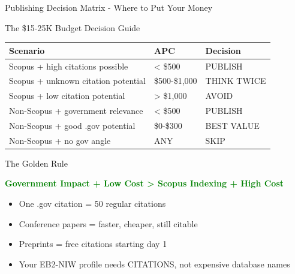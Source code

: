 \documentclass[11pt]{beamer}
\begin{document}
	
	\begin{frame}{Publishing Decision Matrix - Where to Put Your Money}
		\scriptsize
		\begin{block}{The \$15-25K Budget Decision Guide}
			\centering
			\begin{tabular}{|p{3.5cm}|p{3cm}|p{3.5cm}|}
				\hline
				\textbf{Scenario} & \textbf{APC} & \textbf{Decision} \\
				\hline
				Scopus + high citations possible & < \$500 &  PUBLISH \\
				\hline
				Scopus + unknown citation potential & \$500-\$1,000 &  THINK TWICE \\
				\hline
				Scopus + low citation potential & > \$1,000 &  AVOID \\
				\hline
				Non-Scopus + government relevance & < \$500 &   PUBLISH \\
				\hline
				Non-Scopus + good .gov potential & \$0-\$300 &  BEST VALUE \\
				\hline
				Non-Scopus + no gov angle & ANY &  SKIP \\
				\hline
			\end{tabular}
		\end{block}
		
		\begin{block}{The Golden Rule}
			\begin{center}
				\textcolor{green}{\textbf{Government Impact + Low Cost > Scopus Indexing + High Cost}}
			\end{center}
			\begin{itemize}
				\item One .gov citation = 50 regular citations
				\item Conference papers = faster, cheaper, still citable
				\item Preprints = free citations starting day 1
				\item Your EB2-NIW profile needs CITATIONS, not expensive database names
			\end{itemize}
		\end{block}
	\end{frame}
	
\end{document}
